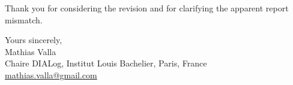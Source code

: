 \documentclass[11pt]{article}
\begin{document}
Thank you for considering the revision and for clarifying the apparent report mismatch.

Yours sincerely,\\
Mathias Valla\\
Chaire DIALog, Institut Louis Bachelier, Paris, France\\
\href{mailto:mathias.valla@gmail.com}{mathias.valla@gmail.com}
\end{document}
